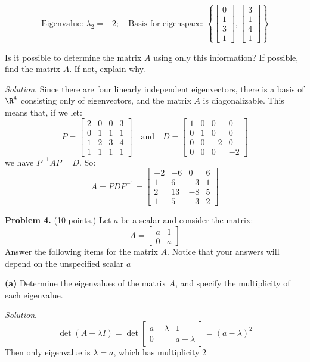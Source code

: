 \documentclass[12pt]{article}
\begin{document}
\[
\text{Eigenvalue: }\lambda_2=-2;\quad
\text{Basis for eigenspace: } \left\{\begin{bmatrix} 0\\ 1\\ 3\\ 1\end{bmatrix},
\begin{bmatrix} 3\\ 1\\ 4\\ 1\end{bmatrix}\right\}
\]

Is it possible to determine the matrix $A$ using only this information? If possible, find the matrix $A$. If not, explain why.

\emph{Solution}. Since there are four linearly independent eigenvectors, there is a basis of $\R^4$ consisting only of eigenvectors, and the matrix $A$ is diagonalizable. This means that, if we let:
\[
P=\left[\begin{matrix}2 & 0 & 0 & 3\\0 & 1 & 1 & 1\\1 & 2 & 3 & 4\\1 & 1 & 1 & 1\end{matrix}\right]
\quad\text{and}\quad
D=\left[\begin{matrix}1 & 0 & 0 & 0\\0 & 1 & 0 & 0\\0 & 0 & -2 & 0\\0 & 0 & 0 & -2\end{matrix}\right]
\]
we have $P^{-1}AP=D$. So:
\[
A = PDP^{-1}=\left[\begin{matrix}-2 & -6 & 0 & 6\\1 & 6 & -3 & 1\\2 & 13 & -8 & 5\\1 & 5 & -3 & 2\end{matrix}\right]
\]
\proofend

\textbf{Problem 4.} (10 points.) Let $a$ be a scalar and consider the matrix:
\[
A = \begin{bmatrix}a&1\\0&a\end{bmatrix}
\]
Answer the following items for the matrix $A$. Notice that your answers will depend on the unspecified scalar $a$

\textbf{(a)} Determine the eigenvalues of the matrix $A$, and specify the multiplicity of each eigenvalue.

\emph{Solution}.
\[
\det(A-\lambda I)=\det\begin{bmatrix}a-\lambda & 1\\0&a-\lambda\end{bmatrix}=(a-\lambda)^2
\]
Then only eigenvalue is $\lambda=a$, which has multiplicity $2$\proofend
\end{document}

